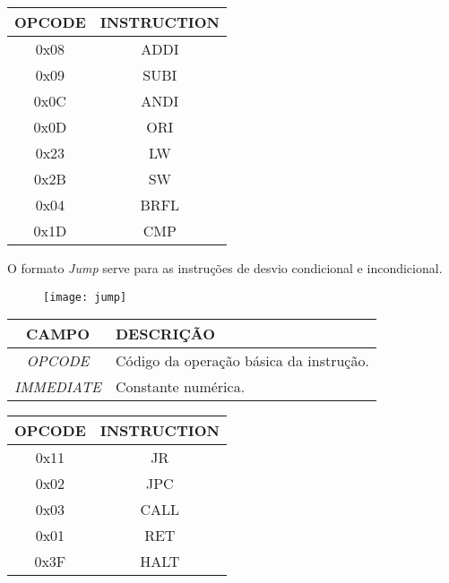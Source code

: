 \begin{table}[H]
\centering	
\begin{tabular}{|c|c|}
	\hline 
  	\cellcolor[gray]{0.9}\textbf{OPCODE} & \cellcolor[gray]{0.9}\textbf{INSTRUCTION} \\ 
	\hline 
	0x08 & ADDI \\ 
	\hline 
	0x09 & SUBI \\ 
	\hline 
	0x0C & ANDI \\ 
	\hline 
	0x0D & ORI \\ 
	\hline
	0x23 & LW \\ 
	\hline 
	0x2B & SW \\
	\hline
	0x04 & BRFL \\ 
  	\hline 
  	0x1D & CMP \\ 
  	\hline
	\end{tabular} 
\end{table}	
	
 O formato \textit{Jump} serve para as instruções de desvio condicional e incondicional. 
 	
   	\begin{figure}[H]
    	\centering
    	\texttt{[image: jump]}
		\label{jump}
  	\end{figure}
  	
\begin{table}[H]
\centering	
\begin{tabular}{|c|l|}
	\hline 
	\cellcolor[gray]{0.9}\textbf{CAMPO} & \cellcolor[gray]{0.9}\textbf{DESCRIÇÃO} \\ 
	\hline 
	\textit{OPCODE} & Código da operação básica da instrução. \\ 
	\hline 
	\textit{IMMEDIATE} & Constante numérica. \\ 
	\hline 
	\end{tabular} 
	\end{table}
 
\begin{table}[H]
\centering 	
  	\begin{tabular}{|c|c|}
  	\hline 
  	\cellcolor[gray]{0.9}\textbf{OPCODE} & \cellcolor[gray]{0.9}\textbf{INSTRUCTION} \\ 
  	\hline 
  	0x11 & JR \\ 
  	\hline 
  	0x02 & JPC \\ 
  	\hline 
  	0x03 & CALL \\ 
  	\hline 
  	0x01 & RET \\ 
  	\hline 
  	0x3F & HALT \\ 
  	\hline 
  	\end{tabular} 
\end{table}